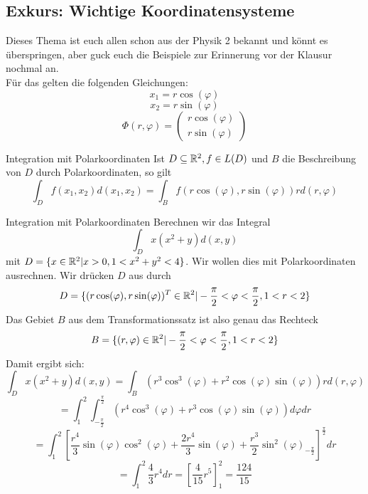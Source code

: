 \subsection{Exkurs: Wichtige Koordinatensysteme}
Dieses Thema ist euch allen schon aus der Physik 2 bekannt und könnt es überspringen, aber guck euch die Beispiele zur Erinnerung vor der Klausur nochmal an. \\
Für das  gelten die folgenden Gleichungen:
$$x_1=r\cos(\varphi)$$
$$x_2=r\sin(\varphi)$$
$$\Phi(r, \varphi) = \begin{pmatrix}
    r\cos(\varphi) \\
    r\sin(\varphi)
\end{pmatrix}$$
\begin{Def}{Integration mit Polarkoordinaten}
Ist $D\subseteq \mathbb{R}^2, f\in L(D)$ und $B$ die Beschreibung von $D$ durch Polarkoordinaten, so gilt
$$\int_D f(x_1,x_2)d(x_1,x_2) = \int_B f(r\cos(\varphi), r\sin(\varphi))rd(r, \varphi)$$
\end{Def}
\begin{Beispiel}{Integration mit Polarkoordinaten}
Berechnen wir das Integral $$\int_D x(x^2+y)d(x,y)$$
mit $D=\{ x\in \mathbb{R}^2 | x>0, 1<x^2+y^2<4\}$. Wir wollen dies mit Polarkoordinaten ausrechnen. Wir drücken $D$ aus durch
$$D=\{ (r\cos(\varphi), r\sin(\varphi))^T \in \mathbb{R}^2 | -\frac{\pi}{2}<\varphi<\frac{\pi}{2}, 1<r<2 \}$$
Das Gebiet $B$ aus dem Transformationssatz ist also genau das Rechteck
$$B=\{ (r,\varphi) \in \mathbb{R}^2 | -\frac{\pi}{2}<\varphi<\frac{\pi}{2}, 1<r<2 \}$$
Damit ergibt sich:
$$\int_D x(x^2+y)d(x,y)=\int_B (r^3\cos^3(\varphi)+r^2\cos(\varphi)\sin(\varphi))rd(r,\varphi)$$
$$=\int_1^2\int_{-\frac{\pi}{2}}^{\frac{\pi}{2}} (r^4\cos^3(\varphi)+r^3\cos(\varphi)\sin(\varphi)) d\varphi dr$$
$$=\int_1^2 [\frac{r^4}{3}\sin(\varphi)\cos^2(\varphi)+\frac{2r^4}{3}\sin(\varphi)+\frac{r^3}{2}\sin^2(\varphi)_{-\frac{\pi}{2}}]^{\frac{\pi}{2}}dr$$
$$=\int_1^2 \frac{4}{3}r^4 dr = [\frac{4}{15}r^5]_1^2=\frac{124}{15}$$
\end{Beispiel}

